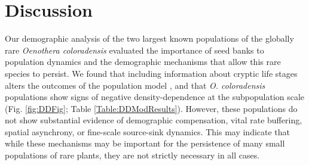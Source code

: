 \documentclass[12pt, letterpaper]{article}
\begin{document}
\section{Discussion}
\normalfont Our demographic analysis of the two largest known populations of the globally rare \textit{Oenothera coloradensis} evaluated the importance of seed banks to population dynamics and the demographic mechanisms that allow this rare species to persist. We found that including information about cryptic life stages alters the outcomes of the population model \cite{Paniw2017, Nguyen2019ConsequencesModels}, and that \textit{O. coloradensis} populations show signs of negative density-dependence at the subpopulation scale (Fig. \ref{fig:DDFig}; Table \ref{Table:DDModResults}). However, these populations do not show substantial evidence of demographic compensation, vital rate buffering, spatial asynchrony, or fine-scale source-sink dynamics. This may indicate that while these mechanisms may be important for the persistence of many small populations of rare plants, they are not strictly necessary in all cases. 
\end{document}
